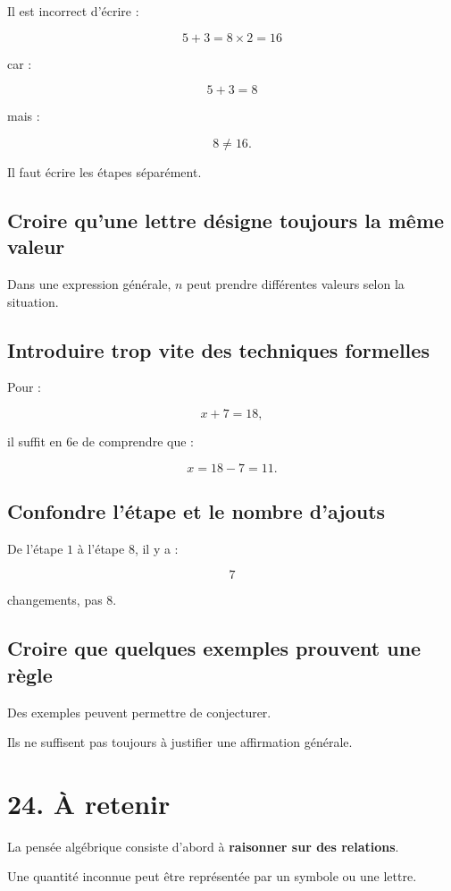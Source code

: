 Il est incorrect d’écrire :

\[
5+3=8\times2=16
\]

car :

\[
5+3=8
\]

mais :

\[
8\neq16.
\]

Il faut écrire les étapes séparément.

\subsection{Croire qu’une lettre désigne toujours la même valeur}

Dans une expression générale, $n$ peut prendre différentes valeurs selon la situation.

\subsection{Introduire trop vite des techniques formelles}

Pour :

\[
x+7=18,
\]

il suffit en 6e de comprendre que :

\[
x=18-7=11.
\]

\subsection{Confondre l’étape et le nombre d’ajouts}

De l’étape $1$ à l’étape $8$, il y a :

\[
7
\]

changements, pas $8$.

\subsection{Croire que quelques exemples prouvent une règle}

Des exemples peuvent permettre de conjecturer.

Ils ne suffisent pas toujours à justifier une affirmation générale.

\section{24. À retenir}

La pensée algébrique consiste d’abord à \textbf{raisonner sur des relations}.

Une quantité inconnue peut être représentée par un symbole ou une lettre.

